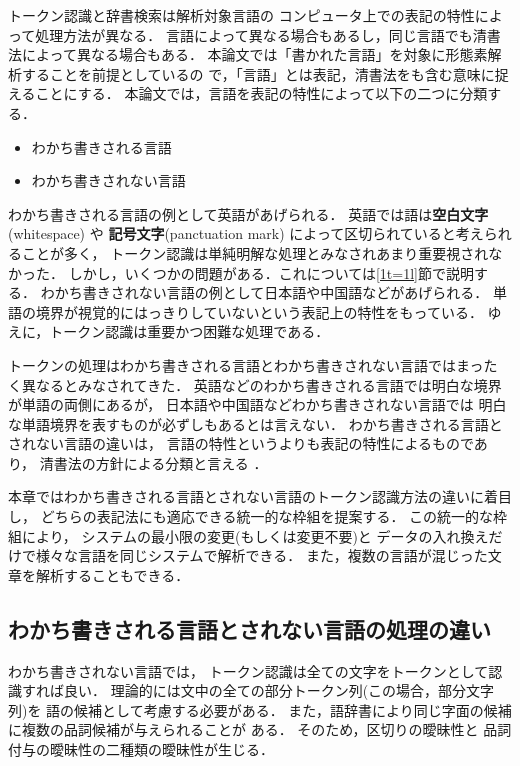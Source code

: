 トークン認識と辞書検索は解析対象言語の
コンピュータ上での表記の特性によって処理方法が異なる．
言語によって異なる場合もあるし，同じ言語でも清書法によって異なる場合もある．
本論文では「書かれた言語」を対象に形態素解析することを前提としているの
で，「言語」とは表記，清書法をも含む意味に捉えることにする．
本論文では，言語を表記の特性によって以下の二つに分類する．
\begin{itemize}
\item わかち書きされる言語
\item わかち書きされない言語
\end{itemize}
わかち書きされる言語の例として英語があげられる．
英語では語は{\bf 空白文字}(whitespace) や
{\bf 記号文字}(panctuation mark) によって区切られていると考えられることが多く，
トークン認識は単純明解な処理とみなされあまり重要視されなかった．
しかし，いくつかの問題がある．これについては\ref{1t=1l}節で説明する．
わかち書きされない言語の例として日本語や中国語などがあげられる．
単語の境界が視覚的にはっきりしていないという表記上の特性をもっている．
ゆえに，トークン認識は重要かつ困難な処理である．

トークンの処理はわかち書きされる言語とわかち書きされない言語ではまった
く異なるとみなされてきた．
英語などのわかち書きされる言語では明白な境界が単語の両側にあるが，
日本語や中国語などわかち書きされない言語では
明白な単語境界を表すものが必ずしもあるとは言えない．
わかち書きされる言語とされない言語の違いは，
言語の特性というよりも表記の特性によるものであり，
清書法の方針による分類と言える
\cite{永田97}．

本章ではわかち書きされる言語とされない言語のトークン認識方法の違いに着目し，
どちらの表記法にも適応できる統一的な枠組を提案する．
この統一的な枠組により，
システムの最小限の変更(もしくは変更不要)と
データの入れ換えだけで様々な言語を同じシステムで解析できる．
また，複数の言語が混じった文章を解析することもできる．



\subsection{わかち書きされる言語とされない言語の処理の違い}

わかち書きされない言語では，
トークン認識は全ての文字をトークンとして認識すれば良い．
理論的には文中の全ての部分トークン列(この場合，部分文字列)を
語の候補として考慮する必要がある．
また，語辞書により同じ字面の候補に複数の品詞候補が与えられることが
ある．
そのため，区切りの曖昧性と
品詞付与の曖昧性の二種類の曖昧性が生じる．

